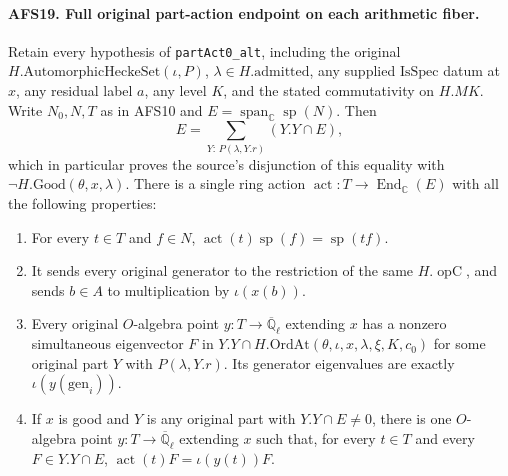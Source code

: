 \documentclass[11pt,a4paper]{article}
\numberwithin{equation}{section}
\theoremstyle{remark}\newtheorem{remark}[theorem]{Remark}
\begin{document}
\paragraph{AFS19. Full original part-action endpoint on each arithmetic fiber.}
\label{claim:AFS19}
Retain every hypothesis of \texttt{part\allowbreak Act0\_\allowbreak alt}, including
the original $H.\mathrm{AutomorphicHeckeSet}(\iota,P)$,
$\lambda\in H.\mathrm{admitted}$, any supplied
$\mathrm{IsSpec}$ datum at $x$, any residual label $a$,
any level $K$, and the stated commutativity on $H.MK$.
Write $N_0,N,T$ as in AFS10 and
$E=\operatorname{span}_{\mathbb C}\operatorname{sp}(N)$.
Then
\[
 E=\sum_{Y:\,P(\lambda,Y.r)}(Y.Y\cap E),
\]
which in particular proves the source's disjunction of
this equality with $\neg H.\mathrm{Good}(\theta,x,\lambda)$.
There is a single ring action
$\operatorname{act}:T\to\operatorname{End}_{\mathbb C}(E)$
with all the following properties:
\begin{enumerate}
\item For every $t\in T$ and $f\in N$,
$\operatorname{act}(t)\operatorname{sp}(f)=\operatorname{sp}(tf)$.
\item It sends every original generator to the restriction
of the same $H.\operatorname{opC}$, and sends $b\in A$
to multiplication by $\iota(x(b))$.
\item Every original $O$-algebra point $y:T\to
\overline{\mathbb Q}_\ell$ extending $x$ has a nonzero
simultaneous eigenvector $F$ in
$Y.Y\cap H.\mathrm{OrdAt}(\theta,\iota,x,\lambda,\xi,K,c_0)$
for some original part $Y$ with $P(\lambda,Y.r)$.  Its
generator eigenvalues are exactly $\iota(y(\mathrm{gen}_i))$.
\item If $x$ is good and $Y$ is any original part with
$Y.Y\cap E\ne0$, there is one $O$-algebra point
$y:T\to\overline{\mathbb Q}_\ell$ extending $x$ such
that, for every $t\in T$ and every $F\in Y.Y\cap E$,
$\operatorname{act}(t)F=\iota(y(t))F$.
\end{enumerate}
\end{document}
